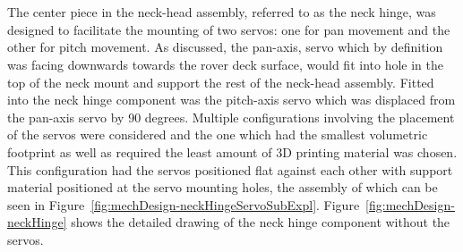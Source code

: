       \newpage
      \\\\
        The center piece in the neck-head assembly, referred to as the neck hinge, was designed to facilitate the mounting of two servos: one for pan movement and the other for pitch movement. As discussed, the pan-axis, servo which by definition was facing downwards towards the rover deck surface, would fit into hole in the top of the neck mount and support the rest of the neck-head assembly. Fitted into the neck hinge component was the pitch-axis servo which was displaced from the pan-axis servo by 90 degrees. Multiple configurations involving the placement of the servos were considered and the one which had the smallest volumetric footprint as well as required the least amount of 3D printing material was chosen. This configuration had the servos positioned flat against each other with support material positioned at the servo mounting holes, the assembly of which can be seen in Figure~\ref{fig:mechDesign-neckHingeServoSubExpl}. Figure~\ref{fig:mechDesign-neckHinge} shows the detailed drawing of the neck hinge component without the servos.
        
